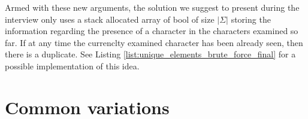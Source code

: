 Armed with these new arguments, the solution we suggest to present during the interview only uses a stack allocated array of bool of size $|\Sigma|$ storing
the information regarding the presence of a character in the characters examined so far. If at any time the currenclty examined character has been already seen, then there is a duplicate. See Listing \ref{list:unique_elements_brute_force_final} for a possible implementation of this idea.

\begin{minipage}{\linewidth}
	
\end{minipage}

\section{Common variations}
